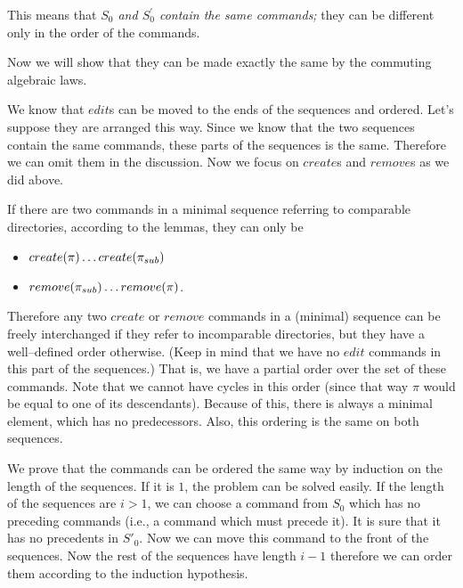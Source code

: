 This means that
\emph{\(S_0\) and \(S^\prime_0\) contain the same commands;} they can be
different only in the order of the commands.

\medskip
Now we will show that they can be made exactly the same by the
commuting algebraic laws. 

We know that \(edit\)s can be moved to the ends of the sequences and
ordered. Let's suppose they are arranged this way.
Since we know that the two sequences contain the same
commands, these parts of the sequences is the same.
Therefore we can omit them in the discussion. Now we focus on
\(create\)s and \(remove\)s as we did above.

If there are two commands in a minimal sequence
referring to comparable directories, according to the lemmas, they
can only be
\begin{itemize}
\item \(create(\pi) \ldots create(\pi_{sub})\)
\item \(remove(\pi_{sub}) \ldots remove(\pi)\).
\end{itemize}

Therefore any two \(create\) or \(remove\) commands in a (minimal)
sequence can be freely interchanged if they refer to incomparable
directories, but they have a well--defined order otherwise. (Keep in
mind that we have no \(edit\) commands in this part of the sequences.)
That is, we have a partial order over the set of these commands. Note
that we cannot have cycles in this order (since that way \(\pi\) would 
be equal to one of its descendants). Because of this, there is always
a minimal element, which has no predecessors. Also, this ordering is the
same on both sequences. 

We prove that the commands can be ordered the same way by induction on the
length of the sequences. If it
is \(1\), the problem can be solved easily. If the length of the sequences
are \(i>1\), we can choose a command from \(S_0\) which has no
preceding commands (i.e., a command which must precede it).
It is sure that it has no precedents in \(S'_0\). Now we
can move this command to the front of the sequences. Now the rest of
the sequences have length \(i-1\) therefore we can order them according to
the induction hypothesis.

